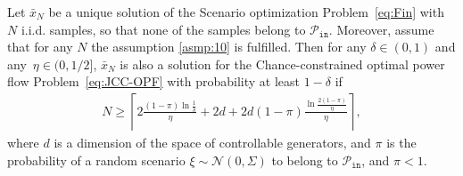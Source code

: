 \begin{theorem}\label{thm:40}
Let $\bar x_N$ be a unique solution of the Scenario optimization Problem~\eqref{eq:Fin} with $N$ i.i.d. samples, so that none of the samples belong to $\mathcal{P}_{\texttt{in}}$. Moreover, assume that for any $N$ the assumption \ref{asmp:10} is fulfilled. Then for any $\delta \in (0,1)$ and any~$\eta \in (0, 1/2]$, $\bar x_N$ is also a solution for the Chance-constrained optimal power flow Problem~\eqref{eq:JCC-OPF} with probability at least $1-\delta$ if 
\begin{align*}
  N \ge \left\lceil 2\frac{(1-\pi)\ln \frac{1}{\delta}}{\eta} + 2d + 2d (1-\pi) \frac{\ln\frac{2(1-\pi)}{\eta}}{\eta} \right\rceil, 
\end{align*} 
where $d$ is a dimension of the space of controllable generators, and $\pi$ is the probability of a random scenario $\xi\sim \mathcal{N}(0, \Sigma)$ to belong to $\mathcal{P}_{\texttt{in}}$, and $\pi < 1$. 
\end{theorem}

